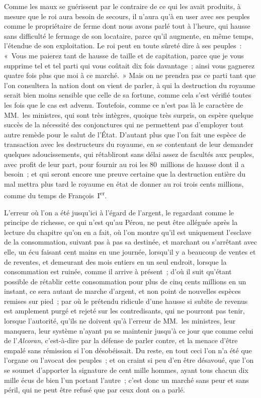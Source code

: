 \documentclass[french,twoside]{book} %
\begin{document}
Comme les maux se guérissent par le contraire de ce qui les avait produits, à mesure que le roi aura besoin de secours, il n’aura qu’à en user avec ses peuples comme le propriétaire de ferme dont nous avons parlé tout à l’heure, qui hausse sans difficulté le fermage de son locataire, parce qu’il augmente, en même temps, l’étendue de son exploitation. Le roi peut en toute sûreté dire à ses peuples : « Vous me paierez tant de hausse de taille et de capitation, parce que je vous supprime tel et tel parti qui vous coûtait dix fois davantage ; ainsi vous gagnerez quatre fois plus que moi à ce marché. » Mais on ne prendra pas ce parti tant que l’on consultera la nation dont on vient de parler, à qui la destruction du royaume serait bien moins sensible que celle de sa fortune, comme cela s’est vérifié toutes les fois que le cas est advenu. Toutefois, comme ce n’est pas là le caractère de MM. les ministres, qui sont très intègres, quoique très surpris, on espère quelque succès de la nécessité des conjonctures qui ne permettent pas d’employer tout autre remède pour le salut de l’État. D’autant plus que l’on fait une espèce de transaction avec les destructeurs du royaume, en se contentant de leur demander quelques adoucissements, qui rétabliront sans délai assez de facultés aux peuples, avec profit de leur part, pour fournir au roi les 80 millions de hausse dont il a besoin ; et qui seront encore une preuve certaine que la destruction entière du mal mettra plus tard le royaume en état de donner au roi trois cents millions, comme du temps de François I\textsuperscript{er}.\par
L’erreur où l’on a été jusqu’ici à l’égard de l’argent, le regardant comme le principe de richesse, ce qui n’est qu’au Pérou, ne peut être alléguée après la lecture du chapitre qu’on en a fait, où l’on montre qu’il est uniquement l’esclave de la consommation, suivant pas à pas sa destinée, et marchant ou s’arrêtant avec elle, un écu faisant cent mains en une journée, lorsqu’il y a beaucoup de ventes et de reventes, et demeurant des mois entiers en un seul endroit, lorsque la consommation est ruinée, comme il arrive à présent ; d’où il suit qu’étant possible de rétablir cette consommation pour plus de cinq cents millions en un instant, ce sera autant de marche d’argent, et non point de nouvelles espèces remises sur pied ; par où le prétendu ridicule d’une hausse si subite de revenus est amplement purgé et rejeté sur les contredisants, qui ne pourront pas tenir, lorsque l’autorité, qu’ils ne doivent qu’à l’erreur de MM. les ministres, leur manquera, leur système n’ayant pu se maintenir jusqu’à ce jour que comme celui de l’{\itshape Alcoran}, c’est-à-dire par la défense de parler contre, et la menace d’être empalé sans rémission si l’on désobéissait. Du reste, en tout ceci l’on n’a été que l’organe ou l’avocat des peuples ; et on craint si peu d’en être désavoué, que l’on se soumet d’apporter la signature de cent mille hommes, ayant tous chacun dix mille écus de bien l’un portant l’autre ; c’est donc un marché sans peur et sans péril, qui ne peut être refusé que par ceux dont on a parlé.\par
\end{document}
